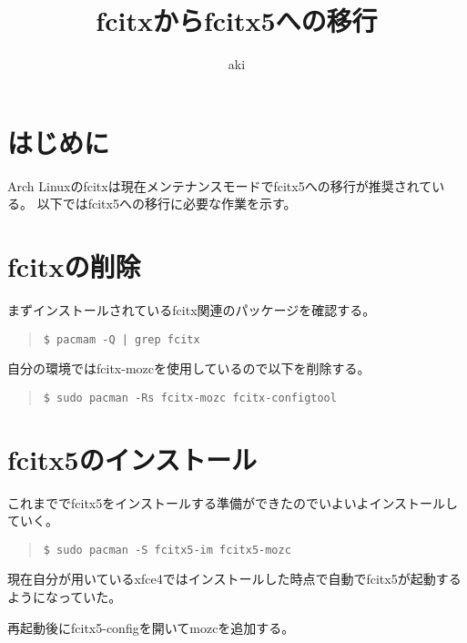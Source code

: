 \documentclass[dvipdfmx]{jsarticle}
\begin{document}
\title{fcitxからfcitx5への移行}
\author{aki}
\thispagestyle{empty}
\maketitle

\section{はじめに}
Arch Linuxのfcitxは現在メンテナンスモードでfcitx5への移行が推奨されている。
以下ではfcitx5への移行に必要な作業を示す。

\section{fcitxの削除}

まずインストールされているfcitx関連のパッケージを確認する。

\begin{quote}
    \begin{verbatim}
$ pacmam -Q | grep fcitx
    \end{verbatim}
\end{quote}

自分の環境ではfcitx-mozcを使用しているので以下を削除する。

\begin{quote}
    \begin{verbatim}
$ sudo pacman -Rs fcitx-mozc fcitx-configtool
    \end{verbatim}
\end{quote}

\section{fcitx5のインストール}

これまででfcitx5をインストールする準備ができたのでいよいよインストールしていく。

\begin{quote}
    \begin{verbatim}
$ sudo pacman -S fcitx5-im fcitx5-mozc
    \end{verbatim}
\end{quote}

現在自分が用いているxfce4ではインストールした時点で自動でfcitx5が起動するようになっていた。


再起動後にfcitx5-configを開いてmozcを追加する。
\end{document}
